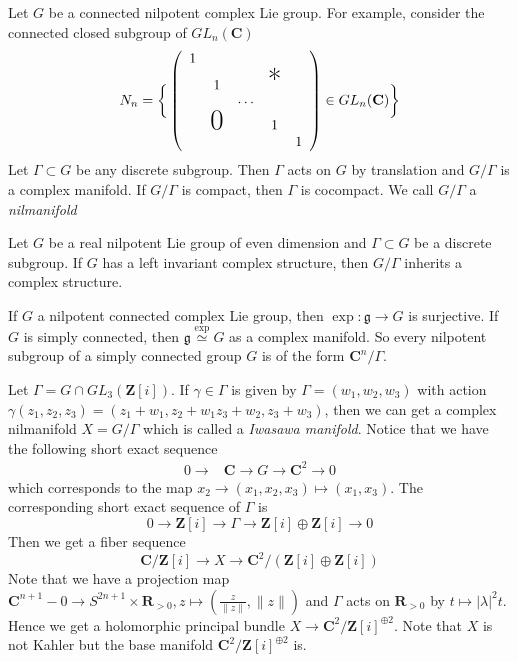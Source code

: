 \documentclass[
11pt, %
letterpaper， %
oneside, %
headinclude,footinclude, %
BCOR5mm, %
]{scrartcl}
\newcommand{\Z}{{\mathbf{Z}}}
\newcommand{\R}{{\mathbf{R}}}
\newcommand{\C}{{\mathbf{C}}}
\newcommand{\its}{\textit}
\begin{document}
\begin{ex}[Nilmanifolds]
	Let $G$ be a connected nilpotent complex Lie group. For example, consider the connected closed subgroup of $GL_n(\C)$
	\begin{equation*}
	N_n=\bigg\{\left(
	\begin{array}{ccccc}
	1                                    \\
	& 1             &   & \text{\huge*}\\
	&               & \cdots                \\
	& \text{\huge 0} &   & 1            \\
	&               &   &   & 1
	\end{array}
	\right)\in GL_n(\C) \bigg\}
	\end{equation*}
	Let $\Gamma\subset G$ be  any discrete subgroup. Then $\Gamma $ acts on $G$ by translation and $G/\Gamma$ is a complex manifold.  If $G/\Gamma$ is compact, then $\Gamma $ is cocompact. We call $G/\Gamma$ a \its{nilmanifold}
\end{ex}
\begin{ex}[Variant]
	Let $G$ be a real nilpotent Lie group of even dimension and $\Gamma \subset G$ be a discrete subgroup. If $G$ has a left invariant complex structure, then $G/\Gamma$ inherits a complex structure.
\end{ex}

\begin{rem}
	If $G$ a nilpotent  connected complex Lie group, then $\exp: \mathfrak{g}\to G$ is surjective. If $G$ is simply connected, then $\mathfrak{g} \stackrel{\exp}{\simeq} G$ as a complex manifold. So every nilpotent subgroup of a simply connected group $G$ is of the form $\C^n/\Gamma$.
\end{rem}

\begin{ex}
	Let $\Gamma=G\cap GL_3(\Z[i])$. If $\gamma\in \Gamma$ is given by $\Gamma=(w_1,w_2,w_3)$ with action $\gamma(z_1,z_2,z_3)=(z_1+w_1,z_2+w_1z_3+w_2,z_3+w_3)$, then we can get a complex nilmanifold $X=G/\Gamma$ which is called a \its{Iwasawa manifold}. Notice that we have the following short exact sequence
	\begin{align*}
	0\to& \C \to G \to \C^2\to 0
	\end{align*}
	which corresponds to the map $x_2\to (x_1,x_2, x_3) \mapsto (x_1, x_3)$. The corresponding short exact sequence of $\Gamma$ is 
	\begin{equation*}
	0\to \Z[i]\to \Gamma \to \Z[i]\oplus\Z[i] \to 0
	\end{equation*}
	Then we get a fiber sequence
	\begin{equation*}
	\C/\Z[i] \to X \to \C^2/(\Z[i]\oplus\Z[i])
	\end{equation*}
	Note that we have a projection map $\C^{n+1}-0 \to S^{2n+1}\times \R_{> 0}, z\mapsto (\frac{z}{\|z\|}, \|z\|)$ and $ \Gamma $ acts on $ \R_{> 0}$ by $ t \mapsto |\lambda|^2 t$. Hence we get a holomorphic principal bundle $X\to \C^2/\Z[i]^{\oplus 2}$. Note that $X$ is not Kahler but the base manifold $\C^2/\Z[i]^{\oplus 2}$ is.
\end{ex}
\end{document}
